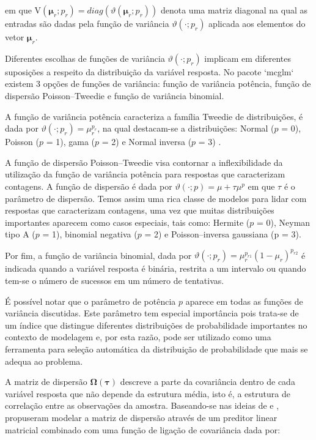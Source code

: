 \documentclass[AMA,STIX1COL]{WileyNJD-v2}
\begin{document}
em que $\mathrm{V}\left(\boldsymbol{\mu}_r; p_r\right) = diag(\vartheta(\boldsymbol{\mu}_r; p_r))$ denota uma matriz diagonal na qual as entradas são dadas pela função de variância $\vartheta(\cdot; p_r)$ aplicada aos elementos do vetor $\boldsymbol{\mu}_r$.

Diferentes escolhas de funções de variância $\vartheta(\cdot; p_r)$ implicam em diferentes suposições a respeito da distribuição da variável resposta. No pacote `mcglm` existem 3 opções de funções de variância: função de variância potência, função de dispersão Poisson–Tweedie e função de variância binomial.

A função de variância potência caracteriza a família Tweedie de distribuições, é dada por $\vartheta\left(\cdot; p_r\right) = \mu^{p_r}_r$, na qual destacam-se a distribuições: Normal ($p$ = 0), Poisson ($p$ = 1), gama ($p$ = 2) e  Normal inversa ($p$ = 3) \citet{Jorgensen87, Jorgensen97}.

A função de dispersão Poisson–Tweedie \citet{Jorgensen15} visa contornar a inflexibilidade da utilização da função de variância potência para respostas que caracterizam contagens. A função de dispersão é dada por $\vartheta\left(\cdot; p\right) = \mu + \tau\mu^p$ em que $\tau$ é o parâmetro de dispersão. Temos assim uma rica classe de modelos para lidar com respostas que caracterizam contagens, uma vez que muitas distribuições importantes aparecem como casos especiais, tais como: Hermite ($p$ = 0), Neyman tipo A ($p$ = 1), binomial negativa ($p$ = 2) e Poisson–inversa gaussiana (p = $3$).

Por fim, a função de variância binomial, dada por $\vartheta\left(\cdot; p_r\right) = \mu^{p_{r1}}_r(1 - \mu_r)^{p_{r2}}$ é indicada quando a variável resposta é binária, restrita a um intervalo ou quando tem-se o número de sucessos em um número de tentativas.

É possível notar que o parâmetro de potência $p$ aparece em todas as funções de variância discutidas. Este parâmetro tem especial importância pois trata-se de um índice que distingue diferentes distribuições de probabilidade importantes no contexto de modelagem e, por esta razão, pode ser utilizado como uma ferramenta para seleção automática da distribuição de probabilidade que mais se adequa ao problema.

A matriz de dispersão $\boldsymbol{\Omega({\tau})}$ descreve a parte da covariância dentro de cada variável resposta que não depende da estrutura média, isto é, a estrutura de correlação entre as observações da amostra. Baseando-se nas ideias de \citet{Anderson73} e \citet{Pourahmadi00}, \citet{Bonat16} propuseram modelar a matriz de dispersão através de um preditor linear matricial combinado com uma função de ligação de covariância dada por:
\end{document}
